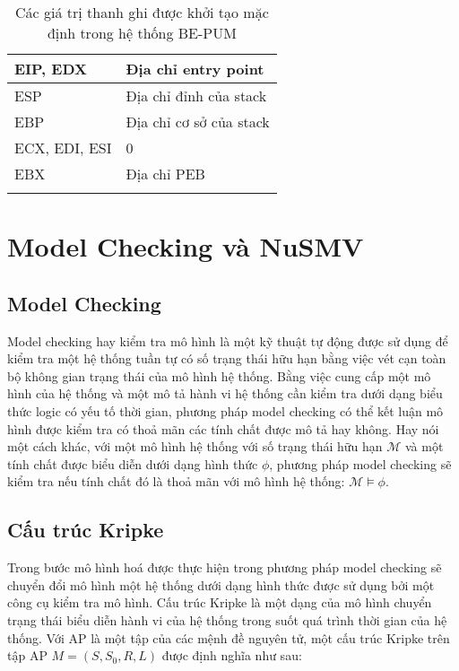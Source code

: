 \begin{longtable}{ | m{5cm} | m{5cm} | }
\hline 
EIP, EDX & Địa chỉ entry point\\
\hline
ESP & Địa chỉ đỉnh của stack\\
\hline
EBP & Địa chỉ cơ sở của stack\\
\hline
ECX, EDI, ESI & 0\\
\hline
EBX & Địa chỉ PEB\\
\hline
\caption{Các giá trị thanh ghi được khởi tạo mặc định trong hệ thống BE-PUM}
\label{table:BepumInitReg}
\end{longtable}

\section{Model Checking và NuSMV}

\subsection{Model Checking}

\hspace{0.5cm}Model checking hay kiểm tra mô hình là một kỹ thuật tự động được sử dụng để kiểm tra một hệ thống tuần tự có số trạng thái hữu hạn bằng việc vét cạn toàn bộ không gian trạng thái của mô hình hệ thống. Bằng việc cung cấp một mô hình của hệ thống và một mô tả hành vi hệ thống cần kiểm tra dưới dạng biểu thức logic có yếu tố thời gian, phương pháp model checking có thể kết luận mô hình được kiểm tra có thoả mãn các tính chất được mô tả hay không. Hay nói một cách khác, với một mô hình hệ thống với số trạng thái hữu hạn $\mathcal{M}$ và một tính chất được biểu diễn dưới dạng hình thức $\phi$, phương pháp model checking sẽ kiểm tra nếu tính chất đó là thoả mãn với mô hình hệ thống: $\mathcal{M}\models\phi$. 

\subsection{Cấu trúc Kripke}

\hspace{0.5cm}Trong bước mô hình hoá được thực hiện trong phương pháp model checking sẽ chuyển đổi mô hình một hệ thống dưới dạng hình thức được sử dụng bởi một công cụ kiểm tra mô hình. Cấu trúc Kripke là một dạng của mô hình chuyển trạng thái biểu diễn hành vi của hệ thống trong suốt quá trình thời gian của hệ thống. Với AP là một tập của các mệnh đề nguyên tử, một cấu trúc Kripke trên tập AP $M = (S, S_0, R, L)$ được định nghĩa như sau:

